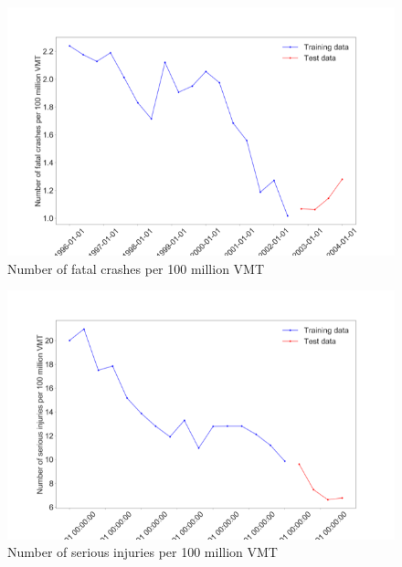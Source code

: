 \documentclass[letterpaper]{article}
\begin{document}
\begin{figure}[h]
\begin{center}
\includegraphics[width=\linewidth]{figures/data-fatalities.png}
\caption{Number of fatal crashes per 100 million VMT}
\label{fig:data-fatalities}
\end{center}
\end{figure}

\begin{figure}[h]
\begin{center}
\includegraphics[width=\linewidth]{figures/data-injuries.png}
\caption{Number of serious injuries per 100 million VMT}
\label{fig:data-injuries}
\end{center}
\end{figure}


\end{document}
